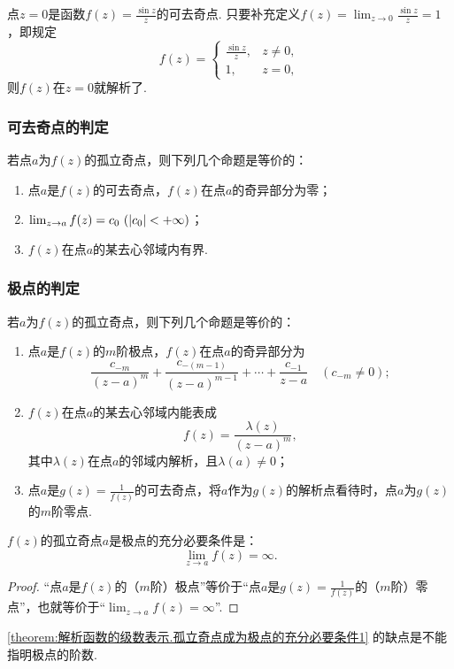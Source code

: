 \begin{example}
点\(z=0\)是函数\(f(z) = \frac{\sin z}{z}\)的可去奇点.
只要补充定义\(f(z) = \lim_{z\to0} \frac{\sin z}{z} = 1\)，即规定\[
f(z) = \left\{ \begin{array}{cc}
\frac{\sin z}{z}, & z\neq0, \\
1, & z=0,
\end{array} \right.
\]则\(f(z)\)在\(z=0\)就解析了.
\end{example}

\subsubsection{可去奇点的判定}
\begin{theorem}\label{theorem:解析函数的级数表示.可去奇点的特征}
若点\(a\)为\(f(z)\)的孤立奇点，则下列几个命题是等价的：
\begin{enumerate}
\item 点\(a\)是\(f(z)\)的可去奇点，\(f(z)\)在点\(a\)的奇异部分为零；
\item \(\lim_{z \to a} f(z) = c_0\ (\abs{c_0} < +\infty)\)；
\item \(f(z)\)在点\(a\)的某去心邻域内有界.
\end{enumerate}
\end{theorem}

\subsubsection{极点的判定}
\begin{theorem}\label{theorem:解析函数的级数表示.极点的特征}
若\(a\)为\(f(z)\)的孤立奇点，则下列几个命题是等价的：
\begin{enumerate}
\item 点\(a\)是\(f(z)\)的\(m\)阶极点，\(f(z)\)在点\(a\)的奇异部分为\[
\frac{c_{-m}}{(z-a)^m} + \frac{c_{-(m-1)}}{(z-a)^{m-1}} + \dotsb + \frac{c_{-1}}{z-a}
\quad(c_{-m}\neq0);
\]

\item \(f(z)\)在点\(a\)的某去心邻域内能表成\[
f(z) = \frac{\lambda(z)}{(z-a)^m},
\]其中\(\lambda(z)\)在点\(a\)的邻域内解析，且\(\lambda(a)\neq0\)；

\item 点\(a\)是\(g(z) = \frac{1}{f(z)}\)的可去奇点，将\(a\)作为\(g(z)\)的解析点看待时，点\(a\)为\(g(z)\)的\(m\)阶零点.
\end{enumerate}
\end{theorem}

\begin{corollary}\label{theorem:解析函数的级数表示.孤立奇点成为极点的充分必要条件1}
\(f(z)\)的孤立奇点\(a\)是极点的充分必要条件是：\[
\lim_{z \to a} f(z) = \infty.
\]
\begin{proof}
“点\(a\)是\(f(z)\)的（\(m\)阶）极点”等价于“点\(a\)是\(g(z) = \frac{1}{f(z)}\)的（\(m\)阶）零点”，也就等价于“\(\lim_{z \to a} f(z) = \infty\)”.
\end{proof}
\end{corollary}
\cref{theorem:解析函数的级数表示.孤立奇点成为极点的充分必要条件1} 的缺点是不能指明极点的阶数.

